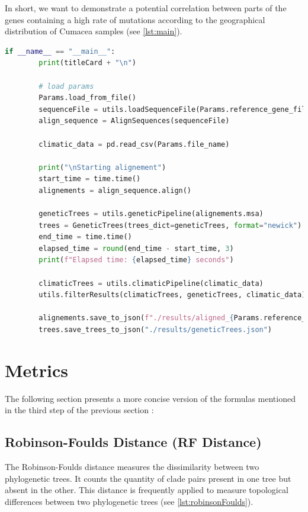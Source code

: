 In short, we want to demonstrate a potential correlation between parts of the genes containing a high rate of mutations according to the geographical distribution of Cumacea samples (see \autoref{lst:main}). 

\begin{lstlisting}[label=lst:main,language=Python,caption=aPhyloGeo’s main function]
    if __name__ == "__main__":
        print(titleCard + "\n")

        # load params 
        Params.load_from_file()
        sequenceFile = utils.loadSequenceFile(Params.reference_gene_filepath)
        align_sequence = AlignSequences(sequenceFile)

        climatic_data = pd.read_csv(Params.file_name)

        print("\nStarting alignement")
        start_time = time.time()
        alignements = align_sequence.align()

        geneticTrees = utils.geneticPipeline(alignements.msa)
        trees = GeneticTrees(trees_dict=geneticTrees, format="newick")
        end_time = time.time()
        elapsed_time = round(end_time - start_time, 3)
        print(f"Elapsed time: {elapsed_time} seconds")

        climaticTrees = utils.climaticPipeline(climatic_data)
        utils.filterResults(climaticTrees, geneticTrees, climatic_data)

        alignements.save_to_json(f"./results/aligned_{Params.reference_gene_file}.json")
        trees.save_trees_to_json("./results/geneticTrees.json")
\end{lstlisting}

\section{Metrics}\label{metrics}
The following section presents a more concise version of the formulas mentioned in the third step of the previous section :

\subsection{Robinson-Foulds Distance (RF Distance)}\label{RF}
The Robinson-Foulds distance measures the dissimilarity between two phylogenetic trees. It counts the quantity of clade pairs present in one tree but absent in the other. This distance is frequently applied to measure topological differences between two phylogenetic trees (see \autoref{lst:robinsonFoulds}).

